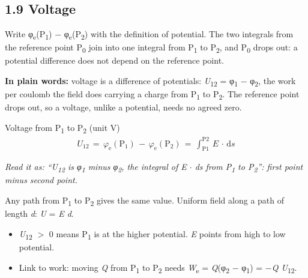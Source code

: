 \documentclass[11pt]{article}
\begin{document}
\begin{keepsection}
\section{1.9 Voltage}

Write φ\textsubscript{e}(P\textsubscript{1}) \ensuremath{-} φ\textsubscript{e}(P\textsubscript{2}) with the definition of potential. The two integrals from the reference point P\textsubscript{0} join into one integral from P\textsubscript{1} to P\textsubscript{2}, and P\textsubscript{0} drops out: a potential difference does not depend on the reference point.

\begin{plainbox}\textbf{In plain words:} voltage is a difference of potentials: \textit{U}\textsubscript{12} = φ\textsubscript{1} \ensuremath{-} φ\textsubscript{2}, the work per coulomb the field does carrying a charge from P\textsubscript{1} to P\textsubscript{2}. The reference point drops out, so a voltage, unlike a potential, needs no agreed zero.\end{plainbox}

\begin{equationcard}{Voltage from P\textsubscript{1} to P\textsubscript{2} (unit V)}
\[ \begin{gathered} {U}_{12}\, =\, φ_{\mathrm{e}}(\mathrm{P}_{1})\, -\, φ_{\mathrm{e}}(\mathrm{P}_{2})\, =\, \int_{\mathrm{P}1}^{\mathrm{P}2} \, {E}\, \cdot \, \mathrm{d}{s} \end{gathered} \]
{\small \emph{Read it as: “U\textsubscript{12} is φ\textsubscript{1} minus φ\textsubscript{2}, the integral of E \ensuremath{\cdot} ds from P\textsubscript{1} to P\textsubscript{2}”: first point minus second point.}\par Any path from P\textsubscript{1} to P\textsubscript{2} gives the same value. Uniform field along a path of length \textit{d}: \textit{U} = \textit{E d}.}
\end{equationcard}

\begin{itemize}
\item \textit{U}\textsubscript{12} \ensuremath{>} 0 means P\textsubscript{1} is at the higher potential. \textit{E} points from high to low potential.
\item Link to work: moving \textit{Q} from P\textsubscript{1} to P\textsubscript{2} needs \textit{W}\textsubscript{e} = \textit{Q}(φ\textsubscript{2} \ensuremath{-} φ\textsubscript{1}) = \ensuremath{-}\textit{Q U}\textsubscript{12}.
\end{itemize}


\end{keepsection}
\end{document}
